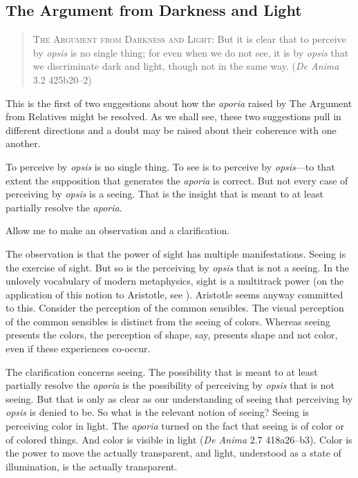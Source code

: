 
\subsection{The Argument from Darkness and Light} %
\label{sub:the_argument_from_darkness}

\begin{quote}
	\textsc{The Argument from Darkness and Light}: But it is clear that to perceive by \emph{opsis} is no single thing; for even when we do not see, it is by \emph{opsis} that we discriminate dark and light, though not in the same way. (\emph{De Anima} 3.2 425b20–2)
\end{quote}

This is the first of two suggestions about how the \emph{aporia} raised by The Argument from Relatives might be resolved. As we shall see, these two suggestions pull in different directions and a doubt may be raised about their coherence with one another.


To perceive by \emph{opsis} is no single thing. To see is to perceive by \emph{opsis}—to that extent the supposition that generates the \emph{aporia} is correct. But not every case of perceiving by \emph{opsis} is a seeing. That is the insight that is meant to at least partially resolve the \emph{aporia}.

Allow me to make an observation and a clarification.

The observation is that the power of sight has multiple manifestations. Seeing is the exercise of sight. But so is the perceiving by \emph{opsis} that is not a seeing. In the unlovely vocabulary of modern metaphysics, sight is a multitrack power (on the application of this notion to Aristotle, see \citealt[3.1.2]{Marmodoro:2014br}). Aristotle seems anyway committed to this. Consider the perception of the common sensibles. The visual perception of the common sensibles is distinct from the seeing of colors. Whereas seeing presents the colors, the perception of shape, say, presents shape and not color, even if these experiences co-occur.

The clarification concerns seeing. The possibility that is meant to at least partially resolve the \emph{aporia} is the possibility of perceiving by \emph{opsis} that is not seeing. But that is only as clear as our understanding of seeing that perceiving by \emph{opsis} is denied to be. So what is the relevant notion of seeing? Seeing is perceiving color in light. The \emph{aporia} turned on the fact that seeing is of color or of colored things. And color is visible in light (\emph{De Anima} 2.7 418a26–b3). Color is the power to move the actually transparent, and light, understood as a state of illumination, is the actually transparent.

